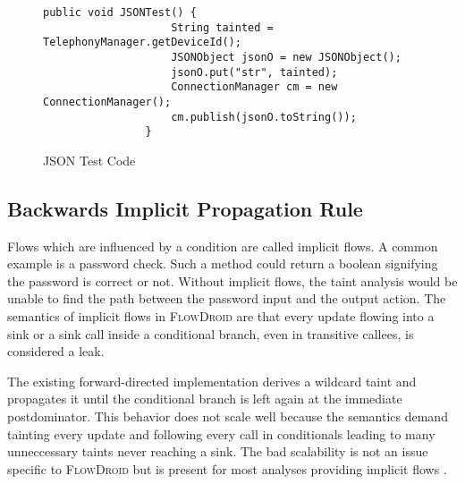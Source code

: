 \documentclass[../draft.tex]{subfiles}
\begin{document}
    \begin{figure}[tbp]
        \centering
        \begin{adjustbox}{max width=\columnwidth}   
            \begin{lstlisting}[gobble=20]
                public void JSONTest() {
                    String tainted = TelephonyManager.getDeviceId();
                    JSONObject jsonO = new JSONObject();
                    jsonO.put("str", tainted);
                    ConnectionManager cm = new ConnectionManager();
                    cm.publish(jsonO.toString());
                }
            \end{lstlisting}
        \end{adjustbox}
        \caption{JSON Test Code}
        \label{lst:json}
    \end{figure}

    \subsection{Backwards Implicit Propagation Rule}
    Flows which are influenced by a condition are called implicit flows.
    A common example is a password check.
    Such a method could return a boolean signifying the password is correct or not.
    Without implicit flows, the taint analysis would be unable to find the path between the password input and the output action.
    The semantics of implicit flows in \textsc{FlowDroid} are that every update flowing into a sink or a sink call inside a conditional branch, even in transitive callees, is considered a leak.

    The existing forward-directed implementation derives a wildcard taint\footnotemark{} and propagates it until the conditional branch is left again at the immediate postdominator.
    This behavior does not scale well because the semantics demand tainting every update and following every call in conditionals leading to many unneccessary taints never reaching a sink.
    The bad scalability is not an issue specific to \textsc{FlowDroid} but is present for most analyses providing implicit flows \cite{King2008}.
\end{document}
